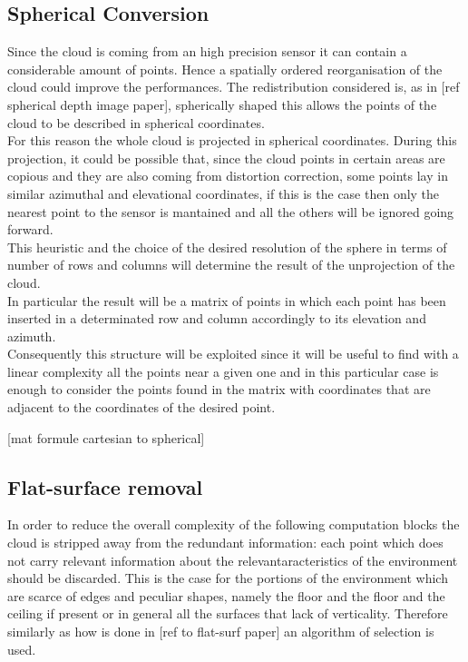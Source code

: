 \documentclass[LaM,binding=0.6cm]{sapthesis}
\begin{document}
\subsection{Spherical Conversion}
Since the cloud is coming from an high precision sensor it can contain a considerable amount of points.
Hence a spatially ordered reorganisation of the cloud could improve the performances. The redistribution considered is, as in [ref spherical depth image paper], spherically shaped this allows the points of the cloud to be described in spherical coordinates.\\
For this reason the whole cloud is projected in spherical coordinates. During this projection, it could be possible that, since the cloud points in certain areas are copious and they are also coming from distortion correction, some points lay in similar azimuthal and elevational coordinates, if this is the case then only the nearest point to the sensor is mantained and all the others will be ignored going forward.\\
This heuristic and the choice of the desired resolution of the sphere in terms of number of rows and columns will determine the result of the unprojection of the cloud.\\
In particular the result will be a matrix of points in which each point has been inserted in a determinated row and column accordingly to its elevation and azimuth.\\
Consequently this structure will be exploited since it will be useful to find with a linear complexity all the points near a given one and in this particular case is enough to consider the points found in the matrix with coordinates that are adjacent to the coordinates of the desired point.

[mat formule cartesian to spherical]

\subsection{ Flat-surface removal}

In order to reduce the overall complexity of the following  computation blocks the cloud is stripped away from the redundant information: each point which does not carry relevant information about the relevantaracteristics of the environment should be discarded. This is the case for the portions of the environment which are scarce of edges and peculiar shapes, namely the floor and the floor and the ceiling if present or in general all the surfaces that lack of verticality. 
Therefore similarly as how is done in [ref to flat-surf paper] an algorithm of selection is used.
\end{document}
